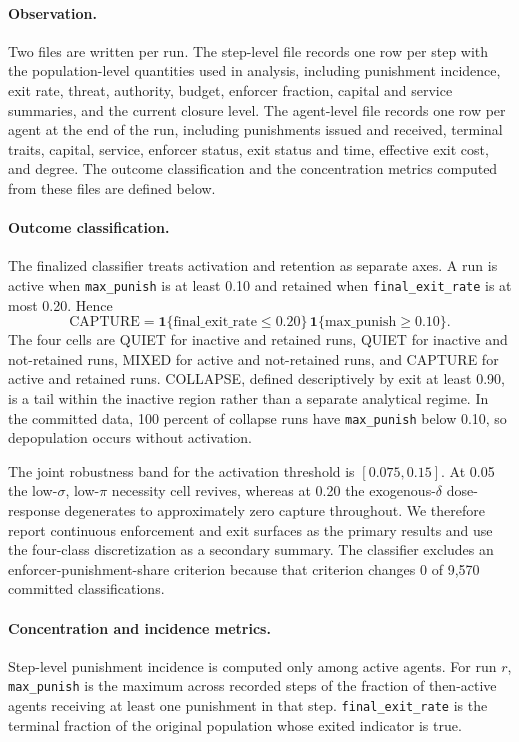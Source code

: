 \documentclass[12pt]{article}
\begin{document}
\paragraph{Observation.} Two files are written per run. The step-level file
records one row per step with the population-level quantities used in analysis,
including punishment incidence, exit rate, threat, authority, budget, enforcer
fraction, capital and service summaries, and the current closure level. The
agent-level file records one row per agent at the end of the run, including
punishments issued and received, terminal traits, capital, service, enforcer
status, exit status and time, effective exit cost, and degree. The outcome
classification and the concentration metrics computed from these files are
defined below.

\paragraph{Outcome classification.} The finalized classifier treats activation
and retention as separate axes. A run is active when \texttt{max\_punish} is at
least 0.10 and retained when \texttt{final\_exit\_rate} is at most 0.20. Hence
\begin{equation}
 \mathrm{CAPTURE}=\mathbf{1}\{\mathrm{final\_exit\_rate}\leq0.20\}\,\mathbf{1}\{\mathrm{max\_punish}\geq0.10\}.
\end{equation}
The four cells are QUIET for inactive and retained runs, QUIET for inactive and
not-retained runs, MIXED for active and not-retained runs, and CAPTURE for
active and retained runs. COLLAPSE, defined descriptively by exit at least 0.90,
is a tail within the inactive region rather than a separate analytical regime.
In the committed data, 100 percent of collapse runs have \texttt{max\_punish}
below 0.10, so depopulation occurs without activation.

The joint robustness band for the activation threshold is \([0.075,0.15]\). At
0.05 the low-\(\sigma\), low-\(\pi\) necessity cell revives, whereas at 0.20 the
exogenous-\(\delta\) dose-response degenerates to approximately zero capture
throughout. We therefore report continuous enforcement and exit surfaces as the
primary results and use the four-class discretization as a secondary summary.
The classifier excludes an enforcer-punishment-share criterion because that
criterion changes 0 of 9,570 committed classifications.

\paragraph{Concentration and incidence metrics.} Step-level punishment incidence
is computed only among active agents. For run \(r\), \texttt{max\_punish} is the
maximum across recorded steps of the fraction of then-active agents receiving at
least one punishment in that step. \texttt{final\_exit\_rate} is the terminal
fraction of the original population whose exited indicator is true.
\end{document}
